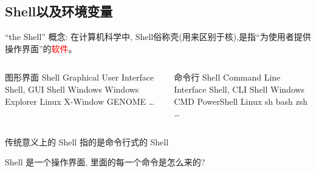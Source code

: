 \subsection{Shell以及环境变量}
\begin{frame}{``the Shell''}
    概念: 在计算机科学中, Shell俗称壳(用来区别于核),是指``为使用者提供操作界面''的\textcolor{red}{软件}。
    \begin{columns}
        \begin{myoutline}
            \1 图形界面 Shell
                \2 Graphical User Interface Shell, GUI Shell
                \2 Windows
                    \3 Windows Explorer
                \2 Linux
                    \3 X-Window
                    \3 GENOME
                    \3 \dots
        \end{myoutline}
        \begin{myoutline}
            \1 命令行 Shell
                \2 Command Line Interface Shell, CLI Shell
                \2 Windows
                    \3 CMD
                    \3 PowerShell
                \2 Linux
                    \3 sh
                    \3 bash
                    \3 zsh
                    \3 \dots
        \end{myoutline}
    \end{columns}

    \tiny{传统意义上的 Shell 指的是命令行式的 Shell}

    \tiny{Shell 是一个操作界面, 里面的每一个命令是怎么来的?}
\end{frame}




